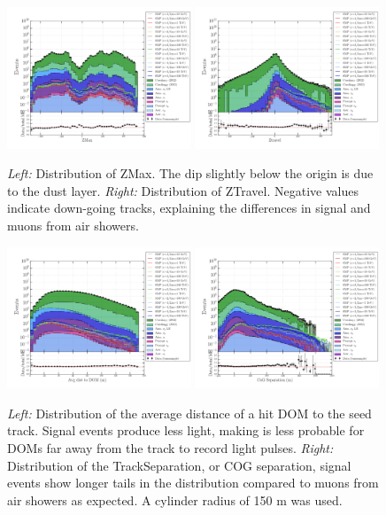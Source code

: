 \begin{figure}
\centering
\includegraphics[width = 0.49\textwidth]{chapter8/img/1D_stack_zmax.png}
\includegraphics[width = 0.49\textwidth]{chapter8/img/1D_stack_ztravel.png}
\caption{\textit{Left: }Distribution of ZMax. The dip slightly below the origin is due to the dust layer. \textit{Right: }Distribution of ZTravel. Negative values indicate down-going tracks, explaining the differences in signal and muons from air showers.}
\label{fig:commonvariables1}
\end{figure}

\begin{figure}
\centering
\includegraphics[width = 0.49\textwidth]{chapter8/img/1D_stack_avdistdom_150.png}
\includegraphics[width = 0.49\textwidth]{chapter8/img/1D_stack_trackseparation_150.png}
\caption{\textit{Left: }Distribution of the average distance of a hit DOM to the seed track. Signal events produce less light, making is less probable for DOMs far away from the track to record light pulses. \textit{Right: }Distribution of the TrackSeparation, or COG separation, signal events show longer tails in the distribution compared to muons from air showers as expected. A cylinder radius of 150 m was used.}
\label{fig:commonvariables2}
\end{figure}

